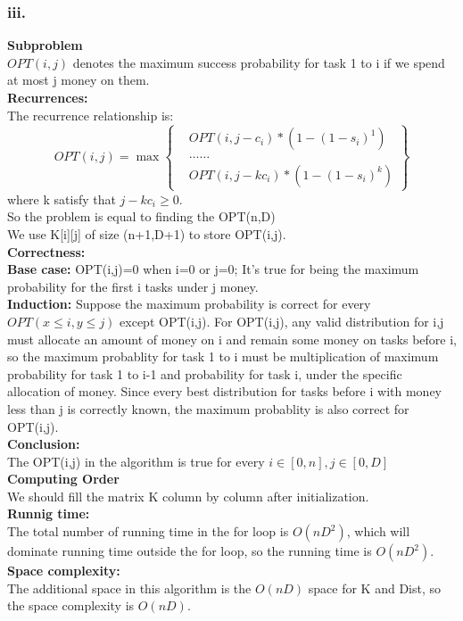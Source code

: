 \documentclass[twoside]{homework}
\begin{document}
\subsubsection*{iii.}
\textbf{Subproblem} 
\\$OPT(i,j)$ denotes the maximum success probability for task 1 to i if we spend at most j money on them.\\
\textbf{Recurrences:}\\ 
The recurrence relationship is: 
$$ OPT(i,j)=\max \left\{
\begin{aligned}
	& OPT(i,j-c_i)*(1-(1-s_i)^{1}) \\
	& \dots \dots\\
	& OPT(i,j-kc_i)*(1-(1-s_i)^{k})
\end{aligned}
\right\}
$$
where k satisfy that $j-kc_i\ge 0$.\\
So the problem is equal to finding the OPT(n,D)\\
We use K[i][j] of size (n+1,D+1) to store OPT(i,j). 
\\\textbf{Correctness:\\}
\textbf{Base case:} OPT(i,j)=0 when i=0 or j=0; It's true for being the maximum probability for the first i tasks under j money.\\
\textbf{Induction:} Suppose the maximum probability is correct for every $OPT(x\le i,y\le j)$ except OPT(i,j). For OPT(i,j), any valid distribution for i,j must allocate an amount of money on i and remain some money on tasks before i, so the maximum probablity for task 1 to i must be multiplication of maximum probability for task 1 to i-1 and probability for task i, under the specific allocation of money. Since every best distribution for tasks before i with money less than j is correctly known, the maximum probablity is also correct for OPT(i,j).\\
\textbf{Conclusion:} \\
The OPT(i,j) in the algorithm is true for every $i \in [0,n], j \in [0,D]$\\
\textbf{Computing Order}\\ 
We should fill the matrix K column by column after initialization.
\\\textbf{Runnig time:\\}
The total number of running time in the for loop is $O(nD^2)$, which will dominate running time outside the for loop, so the running time is $O(nD^2)$.\\
\textbf{Space complexity:\\}
The additional space in this algorithm is the $O(nD)$ space for K and Dist, so the space complexity is $O(nD)$.
\end{document}
